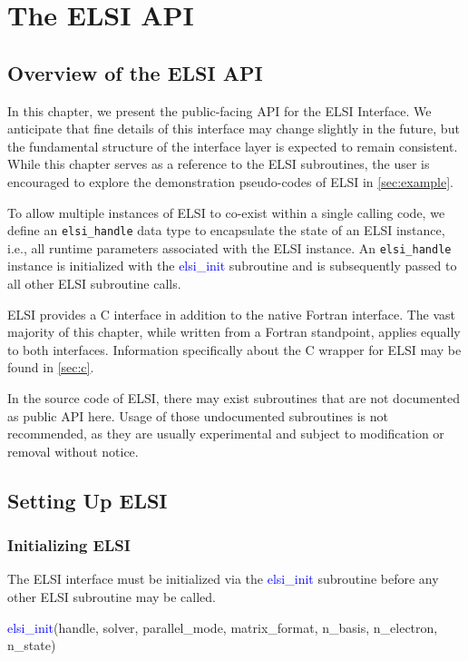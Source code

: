 \documentclass{report}
\begin{document}
\chapter{The ELSI API}
\section{Overview of the ELSI API}
\label{sec:api}
In this chapter, we present the public-facing API for the ELSI Interface. We anticipate that fine details of this interface may change slightly in the future, but the fundamental structure of the interface layer is expected to remain consistent. While this chapter serves as a reference to the ELSI subroutines, the user is encouraged to explore the demonstration pseudo-codes of ELSI in \ref{sec:example}.

To allow multiple instances of ELSI to co-exist within a single calling code, we define an \texttt{elsi\_handle} data type to encapsulate the state of an ELSI instance, i.e., all runtime parameters associated with the ELSI instance. An \texttt{elsi\_handle} instance is initialized with the \textcolor{blue}{elsi\_init} subroutine and is subsequently passed to all other ELSI subroutine calls.

ELSI provides a C interface in addition to the native Fortran interface. The vast majority of this chapter, while written from a Fortran standpoint, applies equally to both interfaces. Information specifically about the C wrapper for ELSI may be found in \ref{sec:c}.

In the source code of ELSI, there may exist subroutines that are not documented as public API here. Usage of those undocumented subroutines is not recommended, as they are usually experimental and subject to modification or removal without notice.

\section{Setting Up ELSI}
\label{sec:setup}
\subsection{Initializing ELSI}
\label{subsec:setup_init}
The ELSI interface must be initialized via the \textcolor{blue}{elsi\_init} subroutine before any other ELSI subroutine may be called.
\begin{labeling}{\hspace{6cm}}
\item [\hspace{0.3cm} \textcolor{blue}{elsi\_init}(handle, solver, parallel\_mode, matrix\_format, n\_basis, n\_electron, n\_state)]
\end{labeling}
\end{document}
